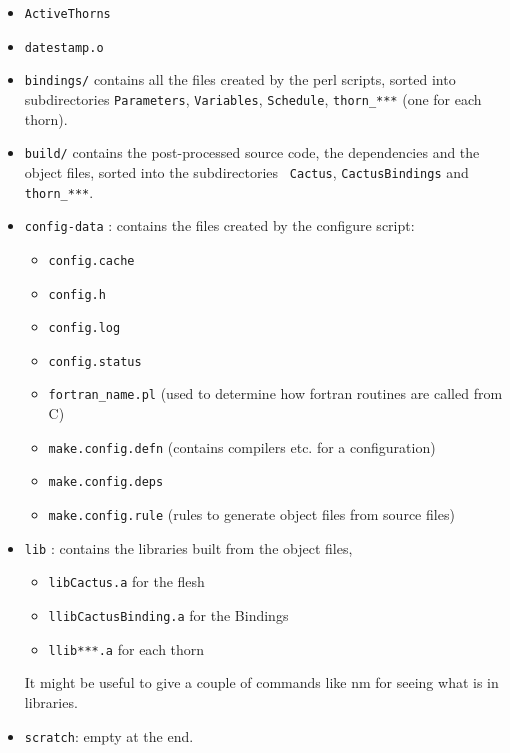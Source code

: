 \begin{itemize}

\item {\tt ActiveThorns} 

\item {\tt datestamp.o}

\item {\tt bindings/} contains all the files created by the perl
scripts, sorted into subdirectories {\tt Parameters}, 
{\tt Variables}, {\tt Schedule}, {\tt thorn\_***} (one for each thorn).

\item {\tt build/} contains the post-processed source code, the
dependencies and the object files, sorted into the subdirectories {\tt
Cactus}, {\tt CactusBindings} and {\tt thorn\_***}.

\item {\tt config-data} : contains the files created by the configure
script:

\begin{itemize}

\item {\tt config.cache}

\item {\tt config.h}

\item {\tt config.log}

\item {\tt config.status}

\item {\tt fortran\_name.pl} (used to determine how fortran routines
are called from C) 

\item {\tt make.config.defn} (contains compilers etc. for a configuration)

\item {\tt make.config.deps}

\item {\tt make.config.rule} (rules to generate object files from source files)
\end{itemize}

\item {\tt lib} : contains the libraries built from the object files,

\begin{itemize}

\item {\tt libCactus.a} for the flesh

\item{\tt llibCactusBinding.a} for the Bindings 

\item {\tt llib***.a} for each thorn

\end{itemize}

{\q It might be useful to give a couple of commands like nm for seeing
what is in libraries.}

\item {\tt scratch}: empty at the end.

\end{itemize}

